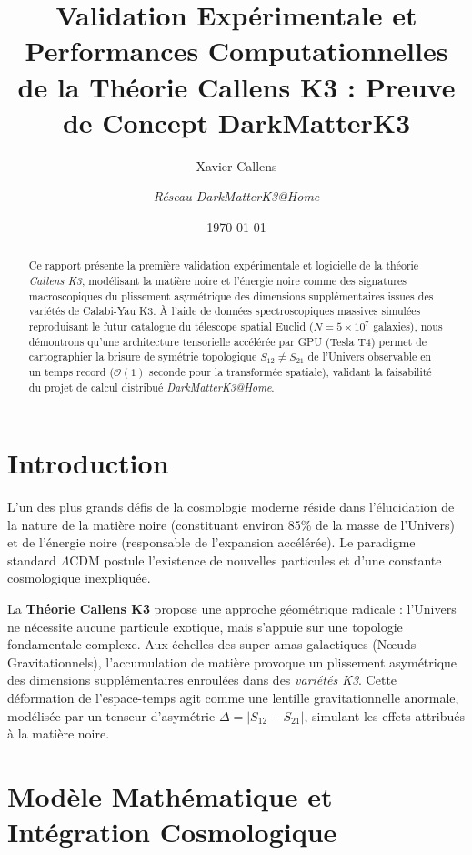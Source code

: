 \documentclass[11pt,a4paper]{article}
\title{\textbf{Validation Expérimentale et Performances Computationnelles de la Théorie Callens K3 : Preuve de Concept DarkMatterK3}}
\author{Xavier Callens \and \textit{Réseau DarkMatterK3@Home}}
\date{\today}
\begin{document}
\maketitle

\begin{abstract}
Ce rapport présente la première validation expérimentale et logicielle de la théorie \textit{Callens K3}, modélisant la matière noire et l'énergie noire comme des signatures macroscopiques du plissement asymétrique des dimensions supplémentaires issues des variétés de Calabi-Yau K3. À l'aide de données spectroscopiques massives simulées reproduisant le futur catalogue du télescope spatial Euclid ($N = 5 \times 10^7$ galaxies), nous démontrons qu'une architecture tensorielle accélérée par GPU (Tesla T4) permet de cartographier la brisure de symétrie topologique $S_{12} \neq S_{21}$ de l'Univers observable en un temps record ($\mathcal{O}(1)$ seconde pour la transformée spatiale), validant la faisabilité du projet de calcul distribué \textit{DarkMatterK3@Home}.
\end{abstract}

\tableofcontents
\vspace{1cm}

\section{Introduction}
L'un des plus grands défis de la cosmologie moderne réside dans l'élucidation de la nature de la matière noire (constituant environ 85\% de la masse de l'Univers) et de l'énergie noire (responsable de l'expansion accélérée). Le paradigme standard $\Lambda$CDM postule l'existence de nouvelles particules et d'une constante cosmologique inexpliquée.

La \textbf{Théorie Callens K3} propose une approche géométrique radicale : l'Univers ne nécessite aucune particule exotique, mais s'appuie sur une topologie fondamentale complexe. Aux échelles des super-amas galactiques (Nœuds Gravitationnels), l'accumulation de matière provoque un plissement asymétrique des dimensions supplémentaires enroulées dans des \textit{variétés K3}. Cette déformation de l'espace-temps agit comme une lentille gravitationnelle anormale, modélisée par un tenseur d'asymétrie $\Delta = |S_{12} - S_{21}|$, simulant les effets attribués à la matière noire.

\section{Modèle Mathématique et Intégration Cosmologique}
\end{document}

